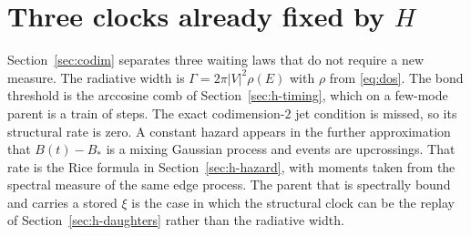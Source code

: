 \section{\texorpdfstring{Three clocks already fixed by \(H\)}{Three clocks already fixed by H}}
\label{sec:h-life}

Section~\ref{sec:codim} separates three waiting laws that do not require a
new measure.
The radiative width is \(\Gamma=2\pi|V|^2\rho(E)\) with \(\rho\) from
\eqref{eq:dos}.
The bond threshold is the arccosine comb of Section~\ref{sec:h-timing},
which on a few-mode parent is a train of steps.
The exact codimension-\(2\) jet condition is missed, so its structural rate
is zero.
A constant hazard appears in the further approximation that \(B(t)-B_*\) is a
mixing Gaussian process and events are upcrossings.
That rate is the Rice formula in Section~\ref{sec:h-hazard}, with moments
taken from the spectral measure of the same edge process.
The parent that is spectrally bound and carries a stored \(\xi\) is the case
in which the structural clock can be the replay of Section~\ref{sec:h-daughters}
rather than the radiative width.
